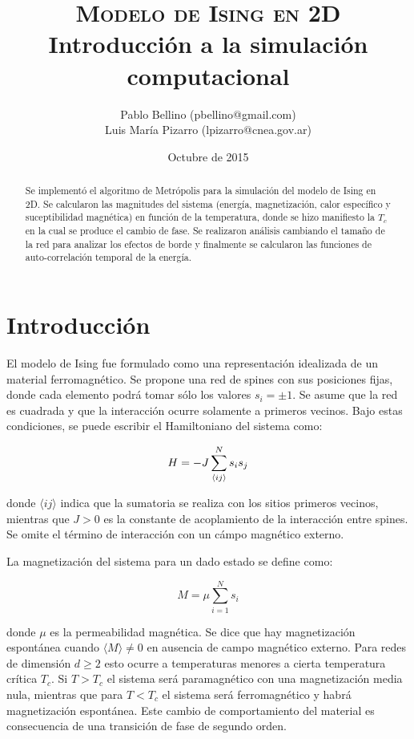 \documentclass[a4paper,12pt]{article}
\title{\textsc{Modelo de Ising en 2D} \\ \vspace{2em} \Large{Introducción a la 
simulación computacional}}
\author{\small{ Pablo Bellino (pbellino@gmail.com)} \\
        \small{Luis María Pizarro (lpizarro@cnea.gov.ar)}}
\date{Octubre de 2015}
\begin{document}

\maketitle

\begin{abstract}
Se implementó el algoritmo de Metrópolis para la simulación del modelo de Ising 
en 2D. Se calcularon las magnitudes del sistema (energía, magnetización, calor 
específico y suceptibilidad magnética) en función de la temperatura, donde se 
hizo manifiesto la $T_c$ en la cual se produce el cambio de fase. Se realizaron 
análisis cambiando el tamaño de la red para analizar los efectos de borde y 
finalmente se calcularon las funciones de auto-correlación temporal de la 
energía.
\end{abstract}


\section{Introducción}

El modelo de Ising fue formulado como una representación idealizada de un 
material ferromagnético. Se propone una red de spines con sus posiciones fijas, 
donde cada elemento podrá tomar sólo los valores $s_i=\pm1$. Se asume que la 
red es cuadrada y que la interacción ocurre solamente a primeros vecinos. Bajo 
estas condiciones, se puede escribir el Hamiltoniano del sistema como:  

\begin{equation}{\label{eq:hamiltoniano}}
H = - J \sum_{\langle ij \rangle}^N s_is_j
\end{equation}

\noindent donde $\langle ij \rangle$ indica que la sumatoria se realiza con los 
sitios primeros vecinos, mientras que $J>0$ es la constante de acoplamiento de 
la interacción entre spines. Se omite el término de interacción con un cámpo 
magnético externo.

La magnetización del sistema para un dado estado se define como:

\begin{equation}
M = \mu \sum_{i=1}^N s_i
\end{equation}

\noindent donde $\mu$ es la permeabilidad magnética. Se dice que hay 
magnetización espontánea cuando $\langle M \rangle \neq 0 $ en ausencia de 
campo magnético externo. Para redes de dimensión $d \geq 2$ esto ocurre a 
temperaturas menores a cierta temperatura crítica $T_c$. Si $T>T_c$ el sistema 
será paramagnético con una magnetización media nula, mientras que para $T<T_c$ 
el sistema será ferromagnético y habrá magnetización espontánea. Este cambio de 
comportamiento del material es consecuencia de una transición de fase de 
segundo orden.
\end{document}
